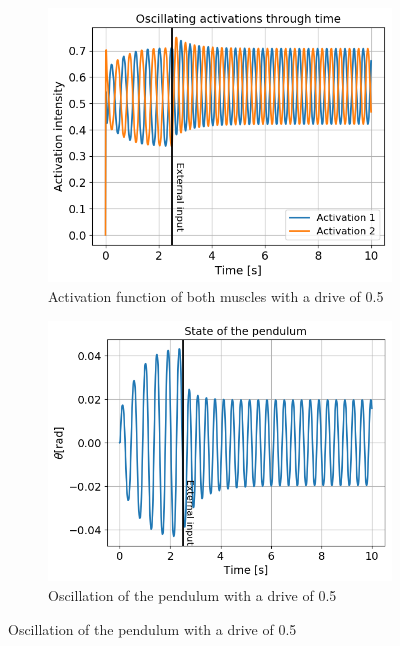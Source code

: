 \documentclass{cmc}
\begin{document}
\begin{figure}[H]
  \centering
  \begin{subfigure}[b]{0.3\textwidth}
     \centering
      \includegraphics[width=\textwidth]{figures/3_b_0dot5_activations.png}
    \caption{Activation function of both muscles with a drive of 0.5}
    \label{fig:3b_output}
  \end{subfigure}
  \begin{subfigure}[b]{0.3\textwidth}
     \centering
      \includegraphics[width=\textwidth]{figures/3_b_0dot5_state.png}
    \caption{Oscillation of the pendulum with a drive of 0.5}
    \label{fig:3b_phase}
  \end{subfigure}

\end{figure}
\end{document}
